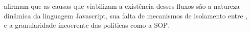 \citeauthor{Jang2010} afirmam que as causas que viabilizam a existência desses fluxos são a natureza dinâmica da linguagem Javascript, sua falta de mecanismos de isolamento entre \scripts{}, e a granularidade incoerente das políticas como a SOP.



